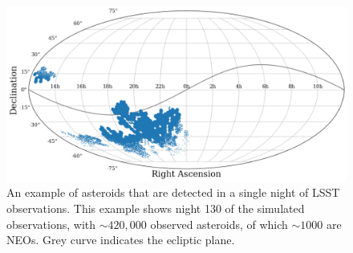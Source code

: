 \documentclass[twocolumn]{aastex631}
\begin{document}
\begin{figure}
    \centering
    \includegraphics[width=\columnwidth]{observations_placeholder.pdf}
    \caption{An example of asteroids that are detected in a single night of LSST observations. This example shows night 130 of the simulated observations, with ${\sim}420,000$ observed asteroids, of which ${\sim}1000$ are NEOs. Grey curve indicates the ecliptic plane.} %
    \label{fig:observations_per_night}
\end{figure}
\end{document}
